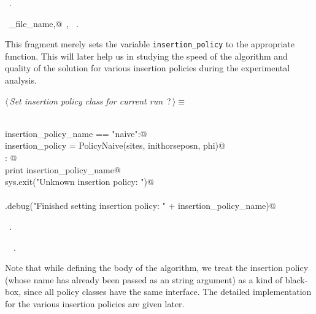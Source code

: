\documentclass[11.5pt]{report}
\begin{document}
\begin{flushleft}
\begin{list}{}{}
\mbox{}\verb@@{\NWsep}
\end{list}
\vspace{-1.5ex}
\footnotesize
\begin{list}{}{\setlength{\itemsep}{-\parsep}\setlength{\itemindent}{-\leftmargin}}
\item \NWtxtMacroRefIn\ .
\item \NWtxtIdentsDefed\nobreak\  \verb@io_file_name,@\nobreak\ , \verb@logger@\nobreak\ .
\item{}
\end{list}
\vspace{4ex}
\end{flushleft}
\newchunk This fragment merely sets the variable \verb|insertion_policy| to 
the appropriate function. This will later help us in studying the speed of 
the algorithm and quality of the solution for various insertion policies 
during the experimental analysis. 

\begin{flushleft} \small\label{scrap24}\raggedright\small
{} $\langle\,${\itshape Set insertion policy class for current run}\nobreak\ {\footnotesize {?}}$\,\rangle\equiv$
\vspace{-1ex}
\begin{list}{}{} \item
\mbox{}\verb@@\\
\mbox{}\verb@if insertion_policy_name == "naive":@\\
\mbox{}\verb@     insertion_policy = PolicyNaive(sites, inithorseposn, phi)@\\
\mbox{}\verb@else: @\\
\mbox{}\verb@     print insertion_policy_name@\\
\mbox{}\verb@     sys.exit("Unknown insertion policy: ")@\\
\mbox{}\verb@@\\
\mbox{}\verb@logger.debug("Finished setting insertion policy: " + insertion_policy_name)@\\
\mbox{}\verb@@{\NWsep}
\end{list}
\vspace{-1.5ex}
\footnotesize
\begin{list}{}{\setlength{\itemsep}{-\parsep}\setlength{\itemindent}{-\leftmargin}}
\item \NWtxtMacroRefIn\ .
\item \NWtxtIdentsUsed\nobreak\  \verb@logger@\nobreak\ .
\item{}
\end{list}
\vspace{4ex}
\end{flushleft}
\newchunk Note that while defining the body of the algorithm, we treat the insertion policy 
(whose name has already been passed as an string argument) as a kind of black-box, since all 
policy classes have the same interface. The detailed implementation for the various 
insertion policies are given later. 
\end{document}
